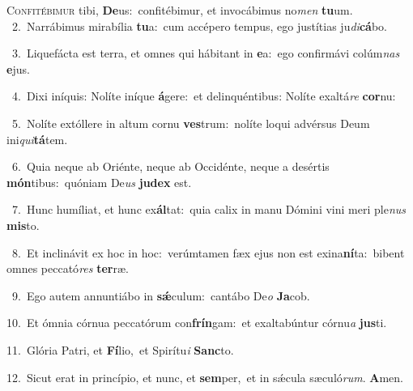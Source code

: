 \lettrine{\initial\textcolor{\initialcolor}{C}}{onfitébimur} tibi, \textbf{De}\-us:~\star confitébimur, et invocábimus no\textit{men} \textbf{tu}\-um.\\
{\numbfont\textcolor{\numbcolor}{~2.}}~Narrábimus mirabília \textbf{tu}\-a:~\star cum accépero tempus, ego justítias ju\-\textit{di}\-\textbf{cá}bo.\par
{\numbfont\textcolor{\numbcolor}{~3.}}~Liquefácta est terra, et omnes qui hábitant in \textbf{e}\-a:~\star ego confirmávi colúm\textit{nas} \textbf{e}\-jus.\par
{\numbfont\textcolor{\numbcolor}{~4.}}~Dixi iníquis: Nolíte iníque \textbf{á}\-gere:~\star et delinquéntibus: Nolíte exaltá\textit{re} \textbf{cor}\-nu:\par
{\numbfont\textcolor{\numbcolor}{~5.}}~Nolíte extóllere in altum cornu \textbf{ves}\-trum:~\star nolíte loqui advérsus Deum ini\-\textit{qui}\-\textbf{tá}tem.\par
{\numbfont\textcolor{\numbcolor}{~6.}}~Quia neque ab Oriénte, neque ab Occidénte, neque a desértis \textbf{món}\-tibus:~\star quóniam De\textit{us} \textbf{ju}\-\textbf{dex} est.\par
{\numbfont\textcolor{\numbcolor}{~7.}}~Hunc humíliat, et hunc ex\-\textbf{ál}\-tat:~\star quia calix in manu Dómini vini meri ple\textit{nus} \textbf{mis}\-to.\par
{\numbfont\textcolor{\numbcolor}{~8.}}~Et inclinávit ex hoc in hoc:~\dagger verúmtamen fæx ejus non est exina\-\textbf{ní}\-ta:~\star bibent omnes peccató\textit{res} \textbf{ter}\-ræ.\par
{\numbfont\textcolor{\numbcolor}{~9.}}~Ego autem annuntiábo in \textbf{sǽ}\-culum:~\star cantábo De\textit{o} \textbf{Ja}\-cob.\par
{\numbfont\textcolor{\numbcolor}{10.}}~Et ómnia córnua peccatórum con\-\textbf{frín}\-gam:~\star et exaltabúntur córnu\textit{a} \textbf{jus}\-ti.\par
{\numbfont\textcolor{\numbcolor}{11.}}~Glória Patri, et \textbf{Fí}\-lio,~\star et Spirítu\textit{i} \textbf{Sanc}\-to.\par
{\numbfont\textcolor{\numbcolor}{12.}}~Sicut erat in princípio, et nunc, et \textbf{sem}\-per,~\star et in sǽcula sæculó\-\textit{rum}\-. \textbf{A}\-men.\par
